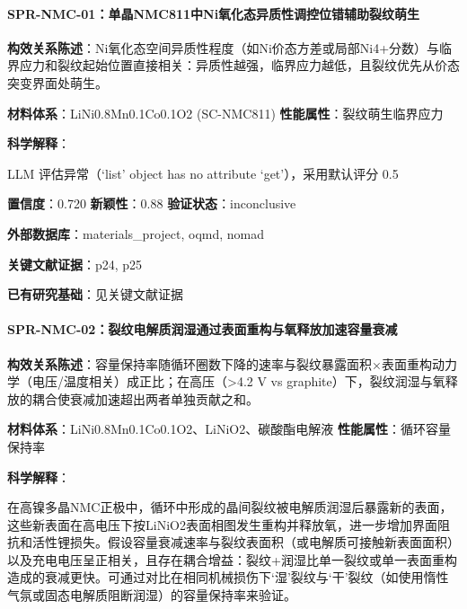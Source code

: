 \documentclass[12pt,a4paper]{ctexart}
\begin{document}
\paragraph{SPR-NMC-01：单晶NMC811中Ni氧化态异质性调控位错辅助裂纹萌生}\label{spr-nmc-01ux5355ux6676nmc811ux4e2dniux6c27ux5316ux6001ux5f02ux8d28ux6027ux8c03ux63a7ux4f4dux9519ux8f85ux52a9ux88c2ux7eb9ux840cux751f}

\textbf{构效关系陈述}：Ni氧化态空间异质性程度（如Ni价态方差或局部Ni4+分数）与临界应力和裂纹起始位置直接相关：异质性越强，临界应力越低，且裂纹优先从价态突变界面处萌生。

\textbf{材料体系}：LiNi0.8Mn0.1Co0.1O2 (SC-NMC811) \textbar{} \textbf{性能属性}：裂纹萌生临界应力

\textbf{科学解释}：

LLM 评估异常（`list' object has no attribute `get'），采用默认评分 0.5

\textbf{置信度}：0.720 \textbar{} \textbf{新颖性}：0.88 \textbar{} \textbf{验证状态}：inconclusive

\textbf{外部数据库}：materials\_project, oqmd, nomad

\textbf{关键文献证据}：p24, p25

\textbf{已有研究基础}：见关键文献证据

\paragraph{SPR-NMC-02：裂纹电解质润湿通过表面重构与氧释放加速容量衰减}\label{spr-nmc-02ux88c2ux7eb9ux7535ux89e3ux8d28ux6da6ux6e7fux901aux8fc7ux8868ux9762ux91cdux6784ux4e0eux6c27ux91caux653eux52a0ux901fux5bb9ux91cfux8870ux51cf}

\textbf{构效关系陈述}：容量保持率随循环圈数下降的速率与裂纹暴露面积×表面重构动力学（电压/温度相关）成正比；在高压（\textgreater4.2 V vs graphite）下，裂纹润湿与氧释放的耦合使衰减加速超出两者单独贡献之和。

\textbf{材料体系}：LiNi0.8Mn0.1Co0.1O2、LiNiO2、碳酸酯电解液 \textbar{} \textbf{性能属性}：循环容量保持率

\textbf{科学解释}：

在高镍多晶NMC正极中，循环中形成的晶间裂纹被电解质润湿后暴露新的表面，这些新表面在高电压下按LiNiO2表面相图发生重构并释放氧，进一步增加界面阻抗和活性锂损失。假设容量衰减速率与裂纹表面积（或电解质可接触新表面面积）以及充电电压呈正相关，且存在耦合增益：裂纹+润湿比单一裂纹或单一表面重构造成的衰减更快。可通过对比在相同机械损伤下`湿'裂纹与`干'裂纹（如使用惰性气氛或固态电解质阻断润湿）的容量保持率来验证。
\end{document}
